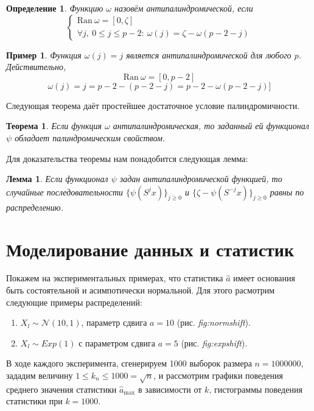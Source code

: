 \documentclass[14pt, a4paper, russian]{report}
\newtheorem{lemma}{\indent Лемма}
\newtheorem{theorem}{\indent Теорема}
\newtheorem{definition}{\indent Определение}
\newtheorem*{example}{\indent Пример}
\begin{document}
\begin{definition}
Функцию $\omega$ назовём \emph{антипалиндромической}, если
\[\begin{cases}
	\mathrm{Ran }\ \omega = \left[0, \zeta\right] \\
	\forall j,\ 0 \le j \le p-2: \  \omega(j) = \zeta - \omega(p-2-j)
\end{cases}\]
\end{definition}


\begin{example}
Функция $\omega(j)=j$ является антипалиндромической для любого $p$. Действительно,
$$
\mathrm{Ran }\ \omega = \left[0, p-2\right]
$$
$$
\omega(j) = j = p-2 - (p-2-j) = p-2 - \omega(p-2-j)]
$$
\end{example}

Следующая теорема даёт простейшее достаточное условие палиндромичности.

\begin{theorem}
Если функция $\omega$ антипалиндромическая, то заданный ей функционал $\psi$ обладает палиндромическим свойством.
\end{theorem}

Для доказательства теоремы нам понадобится следующая лемма:

\begin{lemma}
Если функционал $\psi$ задан антипалиндромической функцией, то случайные последовательности $\{\psi(S^j x)\}_{j \ge 0}$ и $\{ \zeta - \psi(S^{-j} x)\}_{j \ge 0}$ равны по распределению. 
\end{lemma}

\chapter{Моделирование данных и статистик}

Покажем на экспериментальных примерах, что статистика $\hat{a}$ имеет основания быть состоятельной и асимпотически нормальной. Для этого расмотрим следующие примеры распределений:
\begin{enumerate}
  \item $X_l \sim \mathcal{N}(10, 1)$, параметр сдвига $a = 10$ (рис. \textit{fig:normshift}).
  \item $X_l \sim Exp(1)$ с параметром сдвига $a = 5$ (рис. \textit{fig:expshift}).
\end{enumerate}
В ходе каждого эксперимента, сгенерируем 1000 выборок размера $n = 1000000$, зададим величину $1 \le k_n \le 1000 = \sqrt{n}$, и рассмотрим графики поведения среднего значения статистики $\hat{a}_{\max}$ в зависимости от $k$, гистограммы поведения статистики при $k = 1000$.
\end{document}
